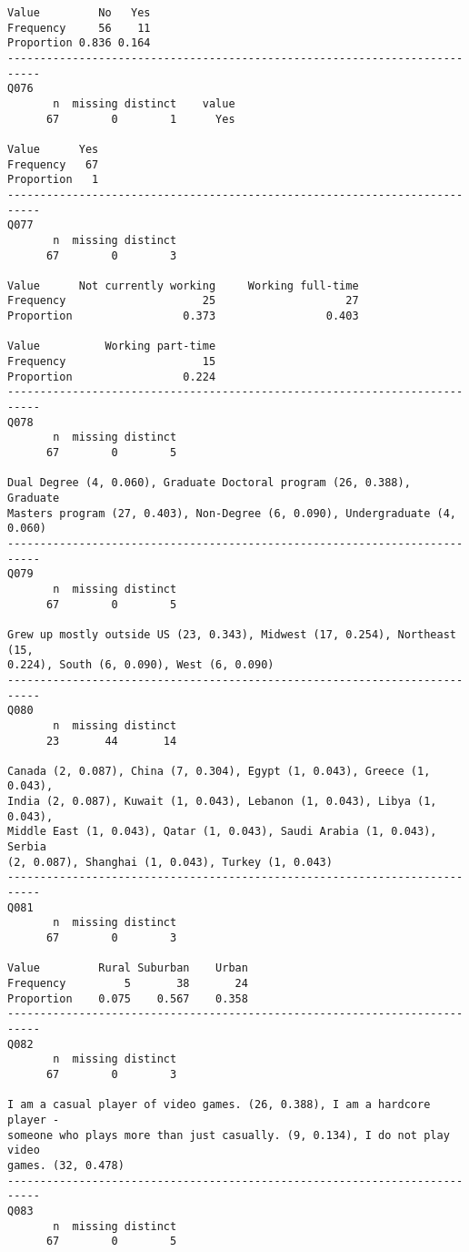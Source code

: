 \documentclass[]{article}
\begin{document}
\begin{verbatim}
Value         No   Yes
Frequency     56    11
Proportion 0.836 0.164
---------------------------------------------------------------------------
Q076 
       n  missing distinct    value 
      67        0        1      Yes 
              
Value      Yes
Frequency   67
Proportion   1
---------------------------------------------------------------------------
Q077 
       n  missing distinct 
      67        0        3 
                                                      
Value      Not currently working     Working full-time
Frequency                     25                    27
Proportion                 0.373                 0.403
                                
Value          Working part-time
Frequency                     15
Proportion                 0.224
---------------------------------------------------------------------------
Q078 
       n  missing distinct 
      67        0        5 

Dual Degree (4, 0.060), Graduate Doctoral program (26, 0.388), Graduate
Masters program (27, 0.403), Non-Degree (6, 0.090), Undergraduate (4,
0.060)
---------------------------------------------------------------------------
Q079 
       n  missing distinct 
      67        0        5 

Grew up mostly outside US (23, 0.343), Midwest (17, 0.254), Northeast (15,
0.224), South (6, 0.090), West (6, 0.090)
---------------------------------------------------------------------------
Q080 
       n  missing distinct 
      23       44       14 

Canada (2, 0.087), China (7, 0.304), Egypt (1, 0.043), Greece (1, 0.043),
India (2, 0.087), Kuwait (1, 0.043), Lebanon (1, 0.043), Libya (1, 0.043),
Middle East (1, 0.043), Qatar (1, 0.043), Saudi Arabia (1, 0.043), Serbia
(2, 0.087), Shanghai (1, 0.043), Turkey (1, 0.043)
---------------------------------------------------------------------------
Q081 
       n  missing distinct 
      67        0        3 
                                     
Value         Rural Suburban    Urban
Frequency         5       38       24
Proportion    0.075    0.567    0.358
---------------------------------------------------------------------------
Q082 
       n  missing distinct 
      67        0        3 

I am a casual player of video games. (26, 0.388), I am a hardcore player -
someone who plays more than just casually. (9, 0.134), I do not play video
games. (32, 0.478)
---------------------------------------------------------------------------
Q083 
       n  missing distinct 
      67        0        5 


\end{verbatim}
\end{document}
